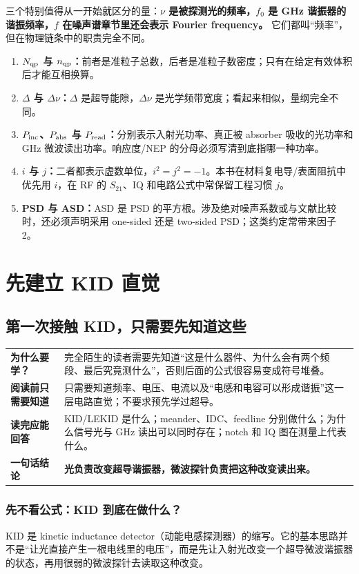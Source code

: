 \documentclass[11pt,a4paper,openany]{ctexrep}
\newcommand{\chapterguide}[4]{%
\begin{tcolorbox}[
  enhanced,
  breakable,
  colback=KidGray!45,
  colframe=KidBlue!65,
  boxrule=0.8pt,
  arc=2mm,
  title=本章导航,
  fonttitle=\bfseries,
  before skip=0.7em,
  after skip=1.0em]
\renewcommand{\arraystretch}{1.18}
\noindent\begin{tabularx}{\textwidth}{>{\bfseries\color{KidBlue}}p{3.0cm} X}
为什么要学？ & #1 \\
阅读前只需要知道 & #2 \\
读完应能回答 & #3 \\
一句话结论 & \textbf{#4} \\
\end{tabularx}
\end{tcolorbox}%
}
\begin{document}
\begin{checkpointbox}
三个特别值得从一开始就区分的量：\textbf{$\nu$ 是被探测光的频率，$f_0$ 是 GHz 谐振器的谐振频率，$f$ 在噪声谱章节里还会表示 Fourier frequency。} 它们都叫“频率”，但在物理链条中的职责完全不同。
\end{checkpointbox}

\begin{tcolorbox}[colback=white,colframe=KidBlue!55,arc=2mm,title=全书统一约定：五组最容易混淆的符号,fonttitle=\bfseries]
\begin{enumerate}
  \item \textbf{$N_{\rm qp}$ 与 $n_{\rm qp}$：}前者是准粒子总数，后者是准粒子数密度；只有在给定有效体积后才能互相换算。
  \item \textbf{$\Delta$ 与 $\Delta\nu$：}$\Delta$ 是超导能隙，$\Delta\nu$ 是光学频带宽度；看起来相似，量纲完全不同。
  \item \textbf{$P_{\rm inc}$、$P_{\rm abs}$ 与 $P_{\rm read}$：}分别表示入射光功率、真正被 absorber 吸收的光功率和 GHz 微波读出功率。响应度/NEP 的分母必须写清到底指哪一种功率。
  \item \textbf{$i$ 与 $j$：}二者都表示虚数单位，$i^2=j^2=-1$。本书在材料复电导/表面阻抗中优先用 $i$，在 RF 的 $S_{21}$、IQ 和电路公式中常保留工程习惯 $j$。
  \item \textbf{PSD 与 ASD：}ASD 是 PSD 的平方根。涉及绝对噪声系数或与文献比较时，还必须声明采用 one-sided 还是 two-sided PSD；这类约定常带来因子 2。
\end{enumerate}
\end{tcolorbox}

\part{先建立 KID 直觉}
\setcounter{chapter}{-1}
\chapter{第一次接触 KID，只需要先知道这些}
\chapterguide
{完全陌生的读者需要先知道“这是什么器件、为什么会有两个频段、最后究竟测什么”，否则后面的公式很容易变成符号堆叠。}
{只需要知道频率、电压、电流以及“电感和电容可以形成谐振”这一层电路直觉；不要求预先学过超导。}
{KID/LEKID 是什么；meander、IDC、feedline 分别做什么；为什么信号光与 GHz 读出可以同时存在；notch 和 IQ 图在测量上代表什么。}
{光负责改变超导谐振器，微波探针负责把这种改变读出来。}

\section{先不看公式：KID 到底在做什么？}
KID 是 kinetic inductance detector（动能电感探测器）的缩写。它的基本思路并不是“让光直接产生一根电线里的电压”，而是先让入射光改变一个超导微波谐振器的状态，再用很弱的微波探针去读取这种改变。
\end{document}
